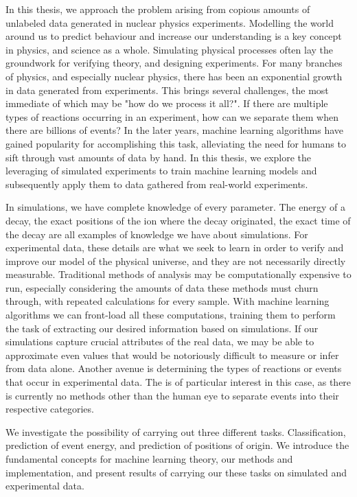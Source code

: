\noindent In this thesis, we approach the problem arising from copious amounts of unlabeled data
generated in nuclear physics experiments. Modelling the world around us to predict behaviour and increase 
our understanding is a key concept in physics, and science as a whole. Simulating physical processes often 
lay the groundwork for verifying theory, and designing experiments. For many branches of physics, 
and especially nuclear physics, there has been an exponential growth in data generated from experiments. 
This brings several challenges, the most immediate of which may be "how do we process it all?". If there are 
multiple types of
reactions occurring in an experiment, how can we separate them when there are billions of events?
In the later years, machine learning algorithms have gained popularity for accomplishing this task,
alleviating the need for humans to sift through vast amounts of data by hand. In this thesis, we
explore the leveraging of simulated experiments to train machine learning models and subsequently
apply them to data gathered from real-world experiments.


\noindent In simulations, we have complete knowledge of every parameter. The energy of a decay, the exact positions
of the ion where the decay originated, the exact time of the decay are all examples of knowledge we have about
simulations. For experimental data, these details are what we seek to learn in order to verify and improve our
model of the physical universe, and they are not necessarily directly measurable.
Traditional methods of analysis may be computationally expensive to run, especially considering the
amounts of data these methods must churn through, with repeated calculations for every sample.
With machine learning algorithms we can front-load all these computations, training them to perform
the task of extracting our desired information based on simulations. If our simulations capture crucial
attributes of the real data, we may be able to approximate even values that would be notoriously difficult 
to measure or infer from data alone. Another avenue is determining the types of reactions or events that
occur in experimental data. The is of particular interest in this case, as there is currently no methods
other than the human eye to separate events into their respective categories. 

\noindent We investigate the possibility of carrying out three different tasks. Classification, prediction of event energy, and prediction of
positions of origin. We introduce the fundamental concepts for machine learning theory, our methods and
implementation, and present results of carrying our these tasks on simulated and experimental data.